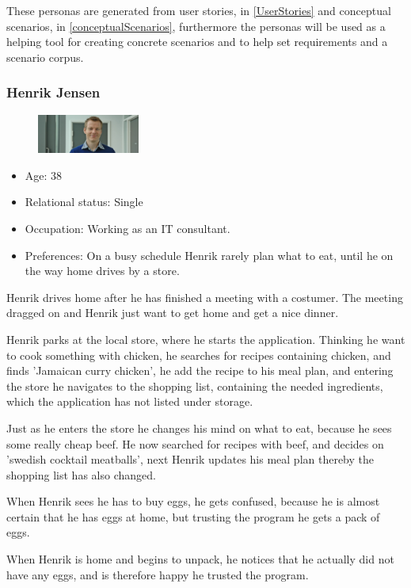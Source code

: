 These personas are generated from user stories, in \cref{UserStories} and conceptual scenarios, in \cref{conceptualScenarios}, furthermore the personas will be used as a helping tool for creating concrete scenarios and to help set requirements and a scenario corpus.

\subsubsection{Henrik Jensen} \label{PersonaHenrikJensen}
\begin{figure}[H]
	\includegraphics[width=0.30\textwidth]{Grafik/FoodPlanner/PersonaHenrikJensen}
\end{figure}
\begin{itemize}
	\item Age: 38
	\item Relational status: Single
	\item Occupation: Working as an IT consultant.
	\item Preferences: On a busy schedule Henrik rarely plan what to eat, until he on the way home drives by a store.
\end{itemize}
Henrik drives home after he has finished a meeting with a costumer. The meeting dragged on and Henrik just want to get home and get a nice dinner.

Henrik parks at the local store, where he starts the application. Thinking he want to cook something with chicken, he searches for recipes containing chicken, and finds 'Jamaican curry chicken', he add the recipe to his meal plan, and entering the store he navigates to the shopping list, containing the needed ingredients, which the application has not listed under storage.

Just as he enters the store he changes his mind on what to eat, because he sees some really cheap beef. He now searched for recipes with beef, and decides on 'swedish cocktail meatballs', next Henrik updates his meal plan thereby the shopping list has also changed.

When Henrik sees he has to buy eggs, he gets confused, because he is almost certain that he has eggs at home, but trusting the program he gets a pack of eggs.

When Henrik is home and begins to unpack, he notices that he actually did not have any eggs, and is therefore happy he trusted the program.


